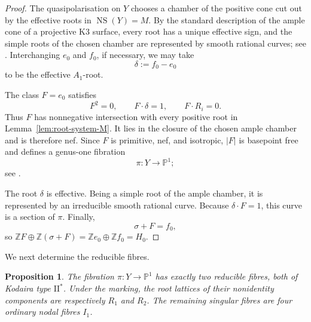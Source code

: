 \documentclass[11pt]{amsart}
\newtheorem{proposition}[theorem]{Proposition}
\theoremstyle{definition}
\newcommand{\NS}{\operatorname{NS}}
\newcommand{\PP}{\mathbb P}
\newcommand{\ZZ}{\mathbb Z}
\begin{document}
\begin{proof}
The quasipolarisation on $Y$ chooses a chamber of the positive cone cut out
by the effective roots in $\NS(Y)=M$.  By the standard description of the
ample cone of a projective K3 surface, every root has a unique effective sign,
and the simple roots of the chosen chamber are represented by smooth rational
curves; see \cite[Chapter~8]{Huy16}.  Interchanging $e_0$ and $f_0$, if
necessary, we may take
\[
\delta:=f_0-e_0
\]
to be the effective $A_1$-root.

The class $F=e_0$ satisfies
\[
F^2=0,\qquad F\cdot\delta=1,\qquad F\cdot R_i=0.
\]
Thus $F$ has nonnegative intersection with every positive root in
Lemma~\ref{lem:root-system-M}.  It lies in the closure of the chosen ample
chamber and is therefore nef.  Since $F$ is primitive, nef, and isotropic,
$|F|$ is basepoint free and defines a genus-one fibration
\[
\pi\colon Y\to\PP^1;
\]
see \cite[Chapter~11]{Huy16}.

The root $\delta$ is effective.  Being a simple root of the ample chamber, it
is represented by an irreducible smooth rational curve.  Because
$\delta\cdot F=1$, this curve is a section of $\pi$.  Finally,
\[
\sigma+F=f_0,
\]
so $\ZZ F\oplus\ZZ(\sigma+F)=\ZZ e_0\oplus\ZZ f_0=H_0$.
\end{proof}

We next determine the reducible fibres.

\begin{proposition}\label{prop:singular-fibres}
The fibration $\pi\colon Y\to\PP^1$ has exactly two reducible fibres, both of
Kodaira type $\mathrm{II}^*$.  Under the marking, the root lattices of their
nonidentity components are respectively $R_1$ and $R_2$.  The remaining
singular fibres are four ordinary nodal fibres $I_1$.
\end{proposition}
\end{document}
